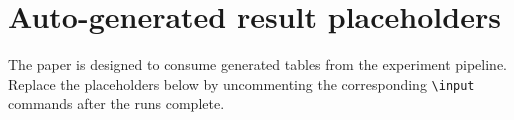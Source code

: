\documentclass{article}
\begin{document}



\appendix
\section{Auto-generated result placeholders}
The paper is designed to consume generated tables from the experiment pipeline. Replace the placeholders below by uncommenting the corresponding \texttt{\textbackslash input} commands after the runs complete.

% 
% 
\end{document}
